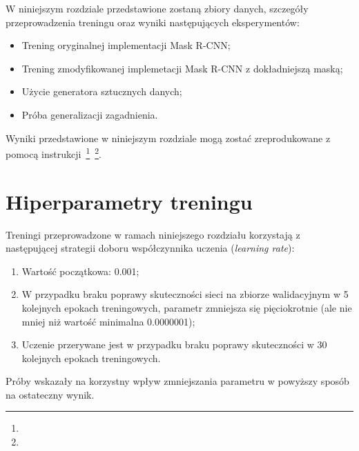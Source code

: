 
W niniejszym rozdziale przedstawione zostaną zbiory danych, szczegóły przeprowadzenia treningu oraz wyniki następujących eksperymentów:

\begin{itemize}
 \item Trening oryginalnej implementacji Mask R-CNN;
 \item Trening zmodyfikowanej implemetacji Mask R-CNN z dokładniejszą maską;
 \item Użycie generatora sztucznych danych;
 \item Próba generalizacji zagadnienia.
\end{itemize}

Wyniki przedstawione w niniejszym rozdziale mogą zostać zreprodukowane z pomocą instrukcji~\footnote{}~\footnote{}.

\section{Hiperparametry treningu}

Treningi przeprowadzone w ramach niniejszego rozdziału korzystają z następującej strategii doboru współczynnika uczenia (\textit{learning rate}):
\begin{enumerate}
  \item Wartość początkowa: 0.001;
  \item W przypadku braku poprawy skuteczności sieci na zbiorze walidacyjnym w 5 kolejnych epokach treningowych, parametr zmniejsza się pięciokrotnie (ale nie mniej niż wartość minimalna 0.0000001);
  \item Uczenie przerywane jest w przypadku braku poprawy skuteczności w 30 kolejnych epokach treningowych.
\end{enumerate}

Próby wskazały na korzystny wpływ zmniejszania parametru w powyższy sposób na ostateczny wynik.
